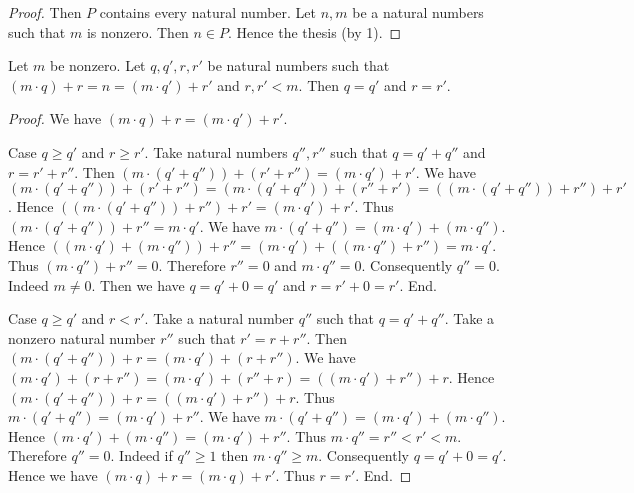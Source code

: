 \documentclass[../../natural-numbers.ftl.tex]{subfiles}
\begin{document}
\begin{forthel}
\begin{proof}
      Then $P$ contains every natural number.
      Let $n,m$ be a natural numbers such that $m$ is nonzero.
      Then $n \in P$.
      Hence the thesis (by 1).
    \end{proof}

    \begin{proposition}[NN 03 02 531279]
      Let $m$ be nonzero.
      Let $q,q',r,r'$ be natural numbers such that $(m \cdot q) + r = n = (m \cdot q') + r'$ and $r,r' < m$.
      Then $q = q'$ and $r = r'$.
    \end{proposition}
    \begin{proof}
      We have $(m \cdot q) + r = (m \cdot q') + r'$.

      Case $q \geq q'$ and $r \geq r'$.
        Take natural numbers $q'',r''$ such that $q = q' + q''$ and $r = r' + r''$.
        Then $(m \cdot (q' + q'')) + (r' + r'') = (m \cdot q') + r'$.
        We have $(m \cdot (q' + q'')) + (r' + r'') = (m \cdot (q' + q'')) + (r'' + r') = ((m \cdot (q' + q'')) + r'') + r'$.
        Hence $((m \cdot (q' + q'')) + r'') + r' = (m \cdot q') + r'$.
        Thus $(m \cdot (q' + q'')) + r'' = m \cdot q'$.
        We have $m \cdot (q' + q'') = (m \cdot q') + (m \cdot q'')$.
        Hence $((m \cdot q') + (m \cdot q'')) + r'' = (m \cdot q') + ((m \cdot q'') + r'') = m \cdot q'$.
        Thus $(m \cdot q'') + r'' = 0$.
        Therefore $r'' = 0$ and $m \cdot q'' = 0$.
        Consequently $q'' = 0$.
        Indeed $m \neq 0$.
        Then we have $q = q' + 0 = q'$  and $r = r' + 0 = r'$.
      End.

      Case $q \geq q'$ and $r < r'$.
        Take a natural number $q''$ such that $q = q' + q''$.
        Take a nonzero natural number $r''$ such that $r' = r + r''$.
        Then $(m \cdot (q' + q'')) + r = (m \cdot q') + (r + r'')$.
        We have $(m \cdot q') + (r + r'') = (m \cdot q') + (r'' + r) = ((m \cdot q') + r'') + r$.
        Hence $(m \cdot (q' + q'')) + r = ((m \cdot q') + r'') + r$.
        Thus $m \cdot (q' + q'') = (m \cdot q') + r''$.
        We have $m \cdot (q' + q'') = (m \cdot q') + (m \cdot q'')$.
        Hence $(m \cdot q') + (m \cdot q'') = (m \cdot q') + r''$.
        Thus $m \cdot q'' = r'' < r' < m$.
        Therefore $q'' = 0$.
        Indeed if $q'' \geq 1$ then $m \cdot q'' \geq m$.
        Consequently $q = q' + 0 = q'$.
        Hence we have $(m \cdot q) + r = (m \cdot q) + r'$.
        Thus $r = r'$.
      End.


\end{proof}
\end{forthel}
\end{document}
